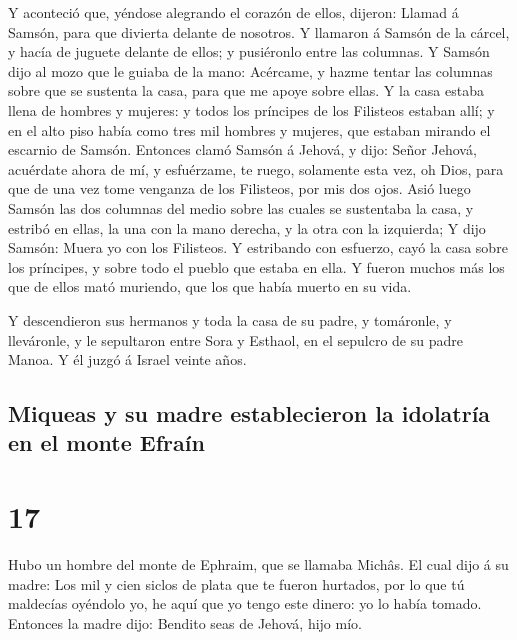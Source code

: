  Y aconteció que, yéndose alegrando el corazón de ellos,
dijeron: Llamad á Samsón, para que divierta delante de nosotros. Y
llamaron á Samsón de la cárcel, y hacía de juguete delante de ellos; y
pusiéronlo entre las columnas.  Y Samsón dijo al mozo que
le guiaba de la mano: Acércame, y hazme tentar las columnas sobre que se
sustenta la casa, para que me apoye sobre ellas.  Y la
casa estaba llena de hombres y mujeres: y todos los príncipes de los
Filisteos estaban allí; y en el alto piso había como tres mil hombres y
mujeres, que estaban mirando el escarnio de Samsón. 
Entonces clamó Samsón á Jehová, y dijo: Señor Jehová, acuérdate ahora de
mí, y esfuérzame, te ruego, solamente esta vez, oh Dios, para que de una
vez tome venganza de los Filisteos, por mis dos ojos. 
Asió luego Samsón las dos columnas del medio sobre las cuales se
sustentaba la casa, y estribó en ellas, la una con la mano derecha, y la
otra con la izquierda;  Y dijo Samsón: Muera yo con los
Filisteos. Y estribando con esfuerzo, cayó la casa sobre los príncipes,
y sobre todo el pueblo que estaba en ella. Y fueron muchos más los que
de ellos mató muriendo, que los que había muerto en su vida.

 Y descendieron sus hermanos y toda la casa de su padre,
y tomáronle, y lleváronle, y le sepultaron entre Sora y Esthaol, en el
sepulcro de su padre Manoa. Y él juzgó á Israel veinte años.

\hypertarget{miqueas-y-su-madre-establecieron-la-idolatruxeda-en-el-monte-efrauxedn}{%
\subsection{Miqueas y su madre establecieron la idolatría en el monte
Efraín}\label{miqueas-y-su-madre-establecieron-la-idolatruxeda-en-el-monte-efrauxedn}}

\hypertarget{section-16}{%
\section{17}\label{section-16}}

 Hubo un hombre del monte de Ephraim, que se llamaba
Michâs.  El cual dijo á su madre: Los mil y cien siclos de
plata que te fueron hurtados, por lo que tú maldecías oyéndolo yo, he
aquí que yo tengo este dinero: yo lo había tomado. Entonces la madre
dijo: Bendito seas de Jehová, hijo mío.

